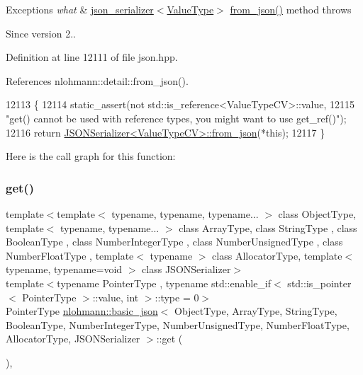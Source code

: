 \begin{DoxyExceptions}{Exceptions}
{\em what} & \hyperlink{classnlohmann_1_1basic__json_a7768841baaaa7a21098a401c932efaff}{json\+\_\+serializer$<$\+Value\+Type$>$} {\ttfamily \hyperlink{namespacenlohmann_1_1detail_a8b99ec9b29f3f20a18fc4281fb784e49}{from\+\_\+json()}} method throws\\
\hline
\end{DoxyExceptions}
\begin{DoxySince}{Since}
version 2.. 
\end{DoxySince}


Definition at line 12111 of file json.\+hpp.



References nlohmann\+::detail\+::from\+\_\+json().


\begin{DoxyCode}
12113     \{
12114         static\_assert(not std::is\_reference<ValueTypeCV>::value,
12115                       \textcolor{stringliteral}{"get() cannot be used with reference types, you might want to use get\_ref()"});
12116         \textcolor{keywordflow}{return} \hyperlink{namespacenlohmann_1_1detail_a8b99ec9b29f3f20a18fc4281fb784e49}{JSONSerializer<ValueTypeCV>::from\_json}(*\textcolor{keyword}{this});
12117     \}
\end{DoxyCode}
Here is the call graph for this function\+:
\mbox{\label{classnlohmann_1_1basic__json_a64135c19425f00b346d8ed63a23db334}} 
\subsubsection{\texorpdfstring{get()}{get()}\hspace{0.1cm}{\footnotesize\ttfamily [4/5]}}
{\footnotesize\ttfamily template$<$template$<$ typename, typename, typename... $>$ class Object\+Type, template$<$ typename, typename... $>$ class Array\+Type, class String\+Type , class Boolean\+Type , class Number\+Integer\+Type , class Number\+Unsigned\+Type , class Number\+Float\+Type , template$<$ typename $>$ class Allocator\+Type, template$<$ typename, typename=void $>$ class J\+S\+O\+N\+Serializer$>$ \\
template$<$typename Pointer\+Type , typename std\+::enable\+\_\+if$<$ std\+::is\+\_\+pointer$<$ Pointer\+Type $>$\+::value, int $>$\+::type  = 0$>$ \\
Pointer\+Type \hyperlink{classnlohmann_1_1basic__json}{nlohmann\+::basic\+\_\+json}$<$ Object\+Type, Array\+Type, String\+Type, Boolean\+Type, Number\+Integer\+Type, Number\+Unsigned\+Type, Number\+Float\+Type, Allocator\+Type, J\+S\+O\+N\+Serializer $>$\+::get (\begin{DoxyParamCaption}{ }\end{DoxyParamCaption})\hspace{0.3cm}{\ttfamily [inline]}, {\ttfamily [noexcept]}}



